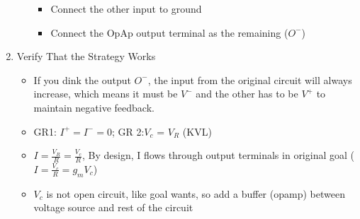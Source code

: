 \documentclass{article}\usepackage{amsmath,amssymb,amsthm,tikz,tkz-graph,color,chngpage,soul,hyperref,csquotes,graphicx,floatrow}\newcommand*{\QEDB}{\hfill\ensuremath{\square}}\newtheorem*{prop}{Proposition}\renewcommand{\theenumi}{\alph{enumi}}\usepackage[shortlabels]{enumitem}\usepackage[nobreak=true]{mdframed}\usetikzlibrary{matrix,calc}\MakeOuterQuote{"}\usepackage[margin=0.75in]{geometry} \newtheorem{theorem}{Theorem}
\begin{document}
\begin{enumerate}[1.]
\begin{itemize}
\begin{itemize}
                \item Connect the other input to ground
                \item Connect the OpAp output terminal as the remaining ($O^-$)
            \end{itemize}
    \end{itemize}
    \item Verify That the Strategy Works
    \begin{itemize}
        \item If you dink the output $O^-$, the input from the original circuit will always increase, which means it must be $V^-$ and the other has to be $V^+$ to maintain negative feedback.
        \item GR1: $I^+=I^-=0$; GR 2:$V_c$ = $V_R$ (KVL)
        \item $I = \frac{V_R}{R} = \frac{V_c}{R}$, By design, I flows through output terminals in original goal ($I = \frac{V_c}{R} = g_mV_c$)
        \item $V_c$ is not open circuit, like goal wants, so add a buffer (opamp) between voltage source and rest of the circuit
    \end{itemize}
\end{enumerate}
\end{document}
